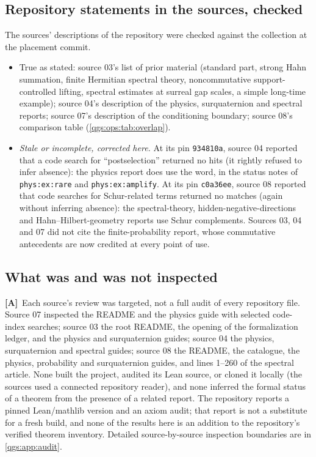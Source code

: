 \documentclass[11pt,oneside]{article}
\numberwithin{equation}{section}
\theoremstyle{plain}
\theoremstyle{definition}
\theoremstyle{remark}
\newcommand{\TA}{\textcolor{TierA}{\textsf{\bfseries[A]}}}
\begin{document}
\subsection{Repository statements in the sources, checked}\label{qgs:sec:stale}
The sources' descriptions of the repository were checked against the collection at the placement commit.
\begin{itemize}
\item True as stated: source 03's list of prior material (standard part, strong Hahn summation, finite Hermitian spectral theory, noncommutative support-controlled lifting, spectral estimates at surreal gap scales, a simple long-time example); source 04's description of the physics, surquaternion and spectral reports; source 07's description of the conditioning boundary; source 08's comparison table (\cref{qgs:ops:tab:overlap}).
\item \emph{Stale or incomplete, corrected here.} At its pin \texttt{934810a}, source 04 reported that a code search for ``postselection'' returned no hits (it rightly refused to infer absence): the physics report does use the word, in the status notes of \texttt{phys:ex:rare} and \texttt{phys:ex:amplify}. At its pin \texttt{c0a36ee}, source 08 reported that code searches for Schur-related terms returned no matches (again without inferring absence): the spectral-theory, hidden-negative-directions and Hahn--Hilbert-geometry reports use Schur complements. Sources 03, 04 and 07 did not cite the finite-probability report, whose commutative antecedents are now credited at every point of use.
\end{itemize}

\subsection{What was and was not inspected}
\TA\ Each source's review was targeted, not a full audit of every repository file. Source 07 inspected the README and the physics guide with selected code-index searches; source 03 the root README, the opening of the formalization ledger, and the physics and surquaternion guides; source 04 the physics, surquaternion and spectral guides; source 08 the README, the catalogue, the physics, probability and surquaternion guides, and lines 1--260 of the spectral article. None built the project, audited its Lean source, or cloned it locally (the sources used a connected repository reader), and none inferred the formal status of a theorem from the presence of a related report. The repository reports a pinned Lean/mathlib version and an axiom audit; that report is not a substitute for a fresh build, and none of the results here is an addition to the repository's verified theorem inventory. Detailed source-by-source inspection boundaries are in \cref{qgs:app:audit}.
\end{document}
